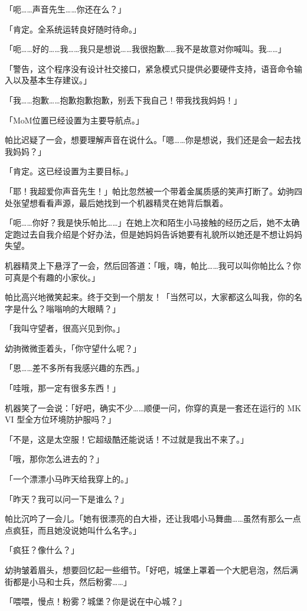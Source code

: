 「呃……声音先生……你还在么？」

「{\mt 肯定。全系统运转良好随时待命。}」

「呃……好的……我……我只是想说……我很抱歉……我不是故意对你喊叫。我……」

「{\mt 警告，这个程序没有设计社交接口，紧急模式只提供必要硬件支持，语音命令输入以及基本生存建议。}」

「我……抱歉……抱歉抱歉抱歉，别丢下我自己！带我找我妈妈！」

「{\mt MoM位置已经设置为主要导航点。}」

帕比迟疑了一会，想要理解声音在说什么。「嗯……你是想说，我们还是会一起去找我妈妈？」

「{\mt 肯定。这已经设置为主要目标。}」

「耶！我超爱你声音先生！」帕比忽然被一个带着金属质感的笑声打断了。幼驹四处张望想看看声源，最后她找到一个机器精灵在她背后飘着。

「呃……你好？我是快乐帕比……」在她上次和陌生小马接触的经历之后，她不太确定跑过去自我介绍是个好办法，但是她妈妈告诉她要有礼貌所以她还是不想让妈妈失望。

机器精灵上下悬浮了一会，然后回答道：「哦，嗨，帕比……我可以叫你帕比么？你可真是个有趣的小家伙。」

帕比高兴地微笑起来。终于交到一个朋友！「当然可以，大家都这么叫我，你的名字是什么？嗡嗡响的大眼睛？」

「我叫守望者，很高兴见到你。」

幼驹微微歪着头，「你守望什么呢？」

「恩……差不多所有我感兴趣的东西。」

「哇哦，那一定有很多东西！」

机器笑了一会说：「好吧，确实不少……顺便一问，你穿的真是一套还在运行的 MK VI 型全方位环境防护服吗？」

「不是，这是太空服！它超级酷还能说话！不过就是我出不来了。」

「哦，那你怎么进去的？」

「一个漂漂小马昨天给我穿上的。」

「昨天？我可以问一下是谁么？」

帕比沉吟了一会儿。「她有很漂亮的白大褂，还让我唱小马舞曲……虽然有那么一点点疯狂，而且她没说她叫什么名字。」

「疯狂？像什么？」

幼驹皱着眉头，想要回忆起一些细节。「好吧，城堡上罩着一个大肥皂泡，然后满街都是小马和士兵，然后粉雾……」

「喂喂，慢点！粉雾？城堡？你是说在中心城？」

